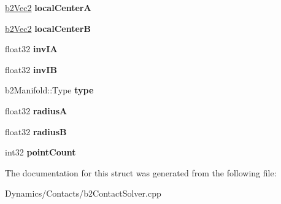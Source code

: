 \begin{DoxyCompactItemize}
\mbox{\label{structb2ContactPositionConstraint_a3c0ff098c54e3c3bfed4470c4f62c4ee}} 
\mbox{\hyperlink{structb2Vec2}{b2\+Vec2}} {\bfseries local\+CenterA}
\item 
\mbox{\label{structb2ContactPositionConstraint_acf14c9cfcf37ae1c89d0e4bc6c2d3ac2}} 
\mbox{\hyperlink{structb2Vec2}{b2\+Vec2}} {\bfseries local\+CenterB}
\item 
\mbox{\label{structb2ContactPositionConstraint_aaf92ebfd9ee6f7734199e7cf65441fdb}} 
float32 {\bfseries inv\+IA}
\item 
\mbox{\label{structb2ContactPositionConstraint_a942566765748c8daf934a051457f4b0f}} 
float32 {\bfseries inv\+IB}
\item 
\mbox{\label{structb2ContactPositionConstraint_a09f96db1c3fe5ede24395e2431e95103}} 
b2\+Manifold\+::\+Type {\bfseries type}
\item 
\mbox{\label{structb2ContactPositionConstraint_ae75232327a6d37b0c36c2a8e12ef08b2}} 
float32 {\bfseries radiusA}
\item 
\mbox{\label{structb2ContactPositionConstraint_a066db66f0b944b92c2666271e88e4540}} 
float32 {\bfseries radiusB}
\item 
\mbox{\label{structb2ContactPositionConstraint_a98c9f0e1e7041ed2b15370ed713b84fc}} 
int32 {\bfseries point\+Count}
\end{DoxyCompactItemize}


The documentation for this struct was generated from the following file\+:\begin{DoxyCompactItemize}
\item 
Dynamics/\+Contacts/b2\+Contact\+Solver.\+cpp\end{DoxyCompactItemize}
